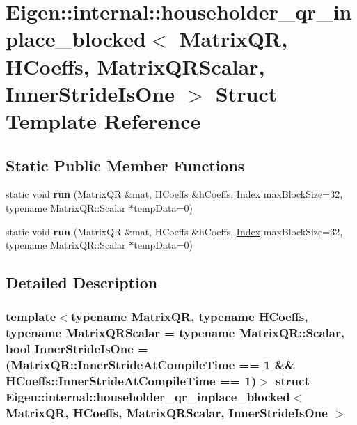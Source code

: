 \hypertarget{struct_eigen_1_1internal_1_1householder__qr__inplace__blocked}{}\section{Eigen\+:\+:internal\+:\+:householder\+\_\+qr\+\_\+inplace\+\_\+blocked$<$ Matrix\+QR, H\+Coeffs, Matrix\+Q\+R\+Scalar, Inner\+Stride\+Is\+One $>$ Struct Template Reference}
\label{struct_eigen_1_1internal_1_1householder__qr__inplace__blocked}
\subsection*{Static Public Member Functions}
\begin{DoxyCompactItemize}
\item 
\mbox{\label{struct_eigen_1_1internal_1_1householder__qr__inplace__blocked_adf1b919ae5f46e4cb6b89a2de673257f}} 
static void {\bfseries run} (Matrix\+QR \&mat, H\+Coeffs \&h\+Coeffs, \hyperlink{namespace_eigen_a62e77e0933482dafde8fe197d9a2cfde}{Index} max\+Block\+Size=32, typename Matrix\+Q\+R\+::\+Scalar $\ast$temp\+Data=0)
\item 
\mbox{\label{struct_eigen_1_1internal_1_1householder__qr__inplace__blocked_adf1b919ae5f46e4cb6b89a2de673257f}} 
static void {\bfseries run} (Matrix\+QR \&mat, H\+Coeffs \&h\+Coeffs, \hyperlink{namespace_eigen_a62e77e0933482dafde8fe197d9a2cfde}{Index} max\+Block\+Size=32, typename Matrix\+Q\+R\+::\+Scalar $\ast$temp\+Data=0)
\end{DoxyCompactItemize}


\subsection{Detailed Description}
\subsubsection*{template$<$typename Matrix\+QR, typename H\+Coeffs, typename Matrix\+Q\+R\+Scalar = typename Matrix\+Q\+R\+::\+Scalar, bool Inner\+Stride\+Is\+One = (\+Matrix\+Q\+R\+::\+Inner\+Stride\+At\+Compile\+Time == 1 \&\& H\+Coeffs\+::\+Inner\+Stride\+At\+Compile\+Time == 1)$>$\newline
struct Eigen\+::internal\+::householder\+\_\+qr\+\_\+inplace\+\_\+blocked$<$ Matrix\+Q\+R, H\+Coeffs, Matrix\+Q\+R\+Scalar, Inner\+Stride\+Is\+One $>$}



